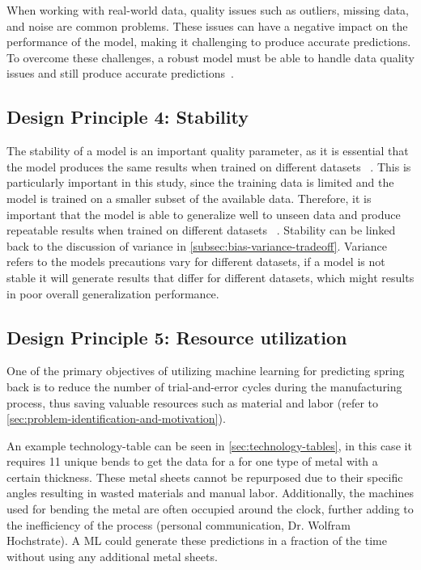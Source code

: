 When working with real-world data, quality issues such as outliers, missing data, and
noise are common problems.
These issues can have a negative impact on the performance of the model, making it challenging to produce accurate
predictions.
To overcome these challenges, a robust model must be able to handle data quality issues and still produce
accurate predictions~\cite[p. 16]{siebert2022construction}.

\subsection*{Design Principle 4: Stability}

The stability of a model is an important quality parameter, as it is essential that
the model produces the same results when trained on different datasets
~\cite[p. 16]{siebert2022construction}.
This is particularly important in this study, since the training data is limited and the model is trained on a
smaller subset of the available data.
Therefore, it is important that the model is able to generalize well to unseen data and
produce repeatable results when trained on different datasets
~\cite[p. 16]{siebert2022construction}.
Stability can be linked back to the discussion of variance in \cref{subsec:bias-variance-tradeoff}.
Variance refers to the models precautions vary for different datasets, if a model is not stable it will generate
results that differ for different datasets, which might results in poor overall generalization performance.


\subsection*{Design Principle 5: Resource utilization}\label{subsec:dp5-resource-utilization}
One of the primary objectives of utilizing machine learning for predicting spring back is to
reduce the number of trial-and-error cycles during the manufacturing process, thus saving
valuable resources such as material and labor
(refer to \cref{sec:problem-identification-and-motivation}).

An example technology-table can be seen in \cref{sec:technology-tables}, in this case it requires 11 unique bends
to get the data for a for one type of metal with a certain thickness.
These metal sheets cannot be repurposed due to their specific angles resulting in wasted materials and manual labor.
Additionally, the machines used for bending the metal are often occupied around the clock, further adding to the
inefficiency of the process (personal communication, Dr. Wolfram Hochstrate).
A \ac{ML} could generate these predictions in a fraction of the time without using any additional metal sheets.

